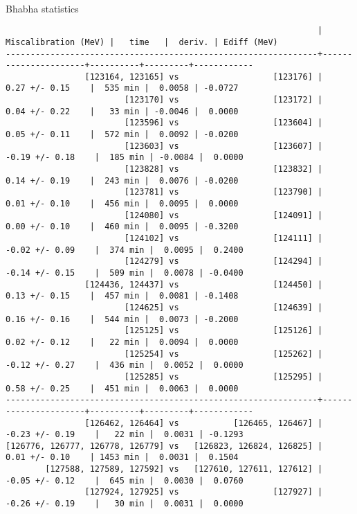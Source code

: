 \documentclass[landscape]{article}
\newenvironment{slide}{\mbox{ }\vfill}{\vfill \mbox{ } \pagebreak}
\begin{document}
\begin{slide}
\begin{center}
\huge Bhabha statistics
\end{center}
\begin{verbatim}
                                                               | Miscalibration (MeV) |   time   |  deriv. | Ediff (MeV)
---------------------------------------------------------------+----------------------+----------+---------+------------
                [123164, 123165] vs                   [123176] |     0.27 +/- 0.15    |  535 min |  0.0058 | -0.0727
                        [123170] vs                   [123172] |     0.04 +/- 0.22    |   33 min | -0.0046 |  0.0000
                        [123596] vs                   [123604] |     0.05 +/- 0.11    |  572 min |  0.0092 | -0.0200
                        [123603] vs                   [123607] |    -0.19 +/- 0.18    |  185 min | -0.0084 |  0.0000
                        [123828] vs                   [123832] |     0.14 +/- 0.19    |  243 min |  0.0076 | -0.0200
                        [123781] vs                   [123790] |     0.01 +/- 0.10    |  456 min |  0.0095 |  0.0000
                        [124080] vs                   [124091] |     0.00 +/- 0.10    |  460 min |  0.0095 | -0.3200
                        [124102] vs                   [124111] |    -0.02 +/- 0.09    |  374 min |  0.0095 |  0.2400
                        [124279] vs                   [124294] |    -0.14 +/- 0.15    |  509 min |  0.0078 | -0.0400
                [124436, 124437] vs                   [124450] |     0.13 +/- 0.15    |  457 min |  0.0081 | -0.1408
                        [124625] vs                   [124639] |     0.16 +/- 0.16    |  544 min |  0.0073 | -0.2000
                        [125125] vs                   [125126] |     0.02 +/- 0.12    |   22 min |  0.0094 |  0.0000
                        [125254] vs                   [125262] |    -0.12 +/- 0.27    |  436 min |  0.0052 |  0.0000
                        [125285] vs                   [125295] |     0.58 +/- 0.25    |  451 min |  0.0063 |  0.0000
---------------------------------------------------------------+----------------------+----------+---------+------------
                [126462, 126464] vs           [126465, 126467] |    -0.23 +/- 0.19    |   22 min |  0.0031 | -0.1293
[126776, 126777, 126778, 126779] vs   [126823, 126824, 126825] |     0.01 +/- 0.10    | 1453 min |  0.0031 |  0.1504
        [127588, 127589, 127592] vs   [127610, 127611, 127612] |    -0.05 +/- 0.12    |  645 min |  0.0030 |  0.0760
                [127924, 127925] vs                   [127927] |    -0.26 +/- 0.19    |   30 min |  0.0031 |  0.0000

\end{verbatim}
\end{slide}
\end{document}
